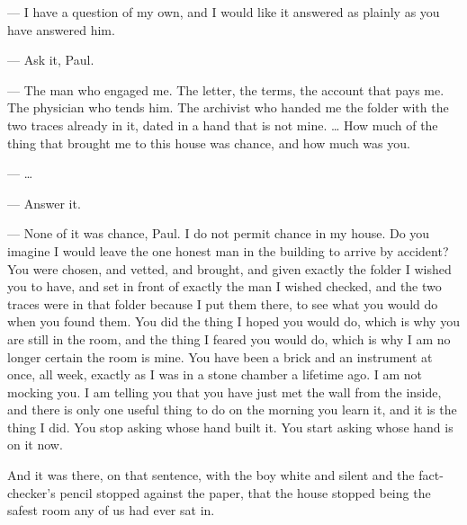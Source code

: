 \begin{room}

--- I have a question of my own, and I would like it answered as plainly as you have answered him.

--- Ask it, Paul.

--- The man who engaged me. The letter, the terms, the account that pays me. The physician who tends him. The archivist who handed me the folder with the two traces already in it, dated in a hand that is not mine. \ldots{} How much of the thing that brought me to this house was chance, and how much was you.

--- \ldots{}

--- Answer it.

--- None of it was chance, Paul. I do not permit chance in my house. Do you imagine I would leave the one honest man in the building to arrive by accident? You were chosen, and vetted, and brought, and given exactly the folder I wished you to have, and set in front of exactly the man I wished checked, and the two traces were in that folder because I put them there, to see what you would do when you found them. You did the thing I hoped you would do, which is why you are still in the room, and the thing I feared you would do, which is why I am no longer certain the room is mine. You have been a brick and an instrument at once, all week, exactly as I was in a stone chamber a lifetime ago. I am not mocking you. I am telling you that you have just met the wall from the inside, and there is only one useful thing to do on the morning you learn it, and it is the thing I did. You stop asking whose hand built it. You start asking whose hand is on it now.

\end{room}

And it was there, on that sentence, with the boy white and silent and the fact-checker's pencil stopped against the paper, that the house stopped being the safest room any of us had ever sat in.\par


